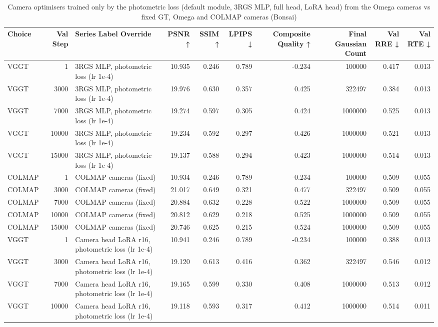 \begin{table}[H]
\caption{\ifdefined\customcaption \customcaption \else Camera optimisers trained only by the photometric loss (default module, 3RGS MLP, full head, LoRA head) from the Omega cameras vs fixed GT, Omega and COLMAP cameras (Bonsai) \fi}
\label{tab:107_omega_photo_vs_fixed_bonsai}
\centering
\tiny
\begin{tabular}{lrlrrrrrrr}
\toprule
Choice & Val Step & Series Label Override & PSNR ↑ & SSIM ↑ & LPIPS ↓ & Composite Quality ↑ & Final Gaussian Count & Val RRE ↓ & Val RTE ↓ \\
\midrule
VGGT & 1 & 3RGS MLP, photometric loss (lr 1e-4) & 10.935 & 0.246 & 0.789 & -0.234 & 100000 & 0.417 & 0.013 \\
VGGT & 3000 & 3RGS MLP, photometric loss (lr 1e-4) & 19.976 & 0.630 & 0.357 & 0.425 & 322497 & 0.384 & 0.013 \\
VGGT & 7000 & 3RGS MLP, photometric loss (lr 1e-4) & 19.274 & 0.597 & 0.305 & 0.424 & 1000000 & 0.525 & 0.013 \\
VGGT & 10000 & 3RGS MLP, photometric loss (lr 1e-4) & 19.234 & 0.592 & 0.297 & 0.426 & 1000000 & 0.521 & 0.013 \\
VGGT & 15000 & 3RGS MLP, photometric loss (lr 1e-4) & 19.137 & 0.588 & 0.294 & 0.423 & 1000000 & 0.514 & 0.013 \\
COLMAP & 1 & COLMAP cameras (fixed) & 10.934 & 0.246 & 0.789 & -0.234 & 100000 & 0.509 & 0.055 \\
COLMAP & 3000 & COLMAP cameras (fixed) & 21.017 & 0.649 & 0.321 & 0.477 & 322497 & 0.509 & 0.055 \\
COLMAP & 7000 & COLMAP cameras (fixed) & 20.884 & 0.632 & 0.228 & 0.522 & 1000000 & 0.509 & 0.055 \\
COLMAP & 10000 & COLMAP cameras (fixed) & 20.812 & 0.629 & 0.218 & 0.525 & 1000000 & 0.509 & 0.055 \\
COLMAP & 15000 & COLMAP cameras (fixed) & 20.746 & 0.625 & 0.215 & 0.524 & 1000000 & 0.509 & 0.055 \\
VGGT & 1 & Camera head LoRA r16, photometric loss (lr 1e-4) & 10.941 & 0.246 & 0.789 & -0.234 & 100000 & 0.388 & 0.013 \\
VGGT & 3000 & Camera head LoRA r16, photometric loss (lr 1e-4) & 19.120 & 0.613 & 0.416 & 0.362 & 322497 & 0.546 & 0.012 \\
VGGT & 7000 & Camera head LoRA r16, photometric loss (lr 1e-4) & 19.165 & 0.599 & 0.330 & 0.408 & 1000000 & 0.513 & 0.012 \\
VGGT & 10000 & Camera head LoRA r16, photometric loss (lr 1e-4) & 19.118 & 0.593 & 0.317 & 0.412 & 1000000 & 0.514 & 0.011 \\

\end{tabular}
\end{table}
